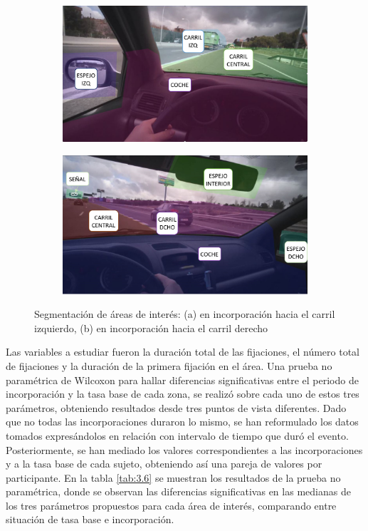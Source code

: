 \begin{figure}[h]
  \centering
  \begin{subfigure}[b]{0.45\textwidth}
    \includegraphics[width=\textwidth]{figures/3.5a.png}
    \caption{}\label{fig:3.5a}
  \end{subfigure}
  \hfill
  \begin{subfigure}[b]{0.45\textwidth}
    \includegraphics[width=\textwidth]{figures/3.5b.png}
    \caption{}\label{fig:3.5b}
  \end{subfigure}
  \caption{Segmentación de áreas de interés: (a) en incorporación hacia el carril izquierdo, (b) en incorporación hacia el carril derecho}
  \label{fig:3.5}
\end{figure}

Las variables a estudiar fueron la duración total de las fijaciones, el número total de fijaciones y la duración de la primera fijación en el área. Una prueba no paramétrica de Wilcoxon para hallar diferencias significativas entre el periodo de incorporación y la tasa base de cada zona, se realizó sobre cada uno de estos tres parámetros, obteniendo resultados desde tres puntos de vista diferentes. Dado que no todas las incorporaciones duraron lo mismo, se han reformulado los datos tomados expresándolos en relación con intervalo de tiempo que duró el evento. Posteriormente, se han mediado los valores correspondientes a las incorporaciones y a la tasa base de cada sujeto, obteniendo así una pareja de valores por participante. En la tabla \ref{tab:3.6} se muestran los resultados de la prueba no paramétrica, donde se observan las diferencias significativas en las medianas de los tres parámetros propuestos para cada área de interés, comparando entre situación de tasa base e incorporación.

